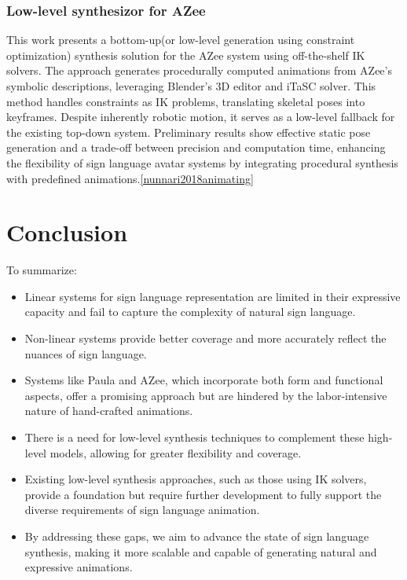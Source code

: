 \documentclass[../../main.tex]{subfiles}
\begin{document}
\subsubsection{Low-level synthesizor for AZee}

This work presents a bottom-up(or low-level generation using constraint optimization) synthesis solution for the AZee system using off-the-shelf IK solvers. The approach generates procedurally computed animations from AZee's symbolic descriptions, leveraging Blender's 3D editor and iTaSC solver. This method handles constraints as IK problems, translating skeletal poses into keyframes. Despite inherently robotic motion, it serves as a low-level fallback for the existing top-down system. Preliminary results show effective static pose generation and a trade-off between precision and computation time, enhancing the flexibility of sign language avatar systems by integrating procedural synthesis with predefined animations.\ref{nunnari2018animating}

\section{Conclusion}

To summarize:
\begin{itemize}
  \item Linear systems for sign language representation are limited in their expressive capacity and fail to capture the complexity of natural sign language.
  \item Non-linear systems provide better coverage and more accurately reflect the nuances of sign language.
  \item Systems like Paula and AZee, which incorporate both form and functional aspects, offer a promising approach but are hindered by the labor-intensive nature of hand-crafted animations.
  \item There is a need for low-level synthesis techniques to complement these high-level models, allowing for greater flexibility and coverage.
  \item Existing low-level synthesis approaches, such as those using IK solvers, provide a foundation but require further development to fully support the diverse requirements of sign language animation.
  \item By addressing these gaps, we aim to advance the state of sign language synthesis, making it more scalable and capable of generating natural and expressive animations.
\end{itemize}
\end{document}

